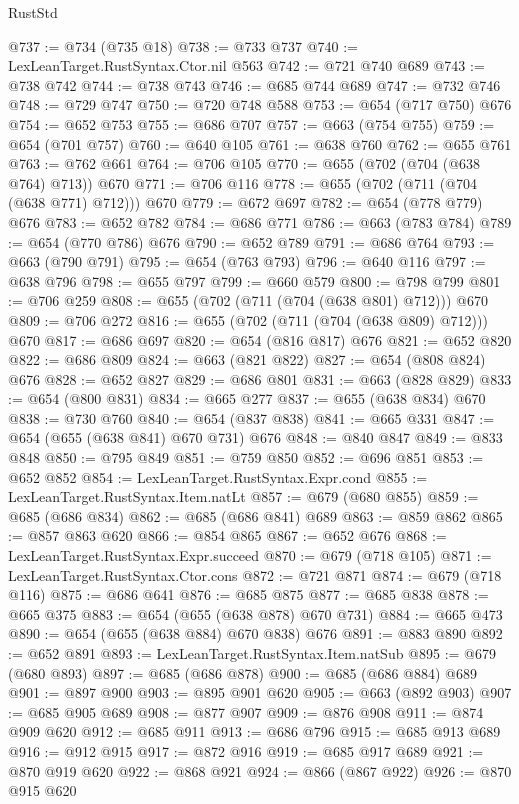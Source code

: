 \begin{lexlean}{RustStd}
\begin{coremodule}
@737 := @734 (@735 @18)
@738 := @733 @737
@740 := LexLeanTarget.RustSyntax.Ctor.nil @563
@742 := @721 @740 @689
@743 := @738 @742
@744 := @738 @743
@746 := @685 @744 @689
@747 := @732 @746
@748 := @729 @747
@750 := @720 @748 @588
@753 := @654 (@717 @750) @676
@754 := @652 @753
@755 := @686 @707
@757 := @663 (@754 @755)
@759 := @654 (@701 @757)
@760 := @640 @105
@761 := @638 @760
@762 := @655 @761
@763 := @762 @661
@764 := @706 @105
@770 := @655 (@702 (@704 (@638 @764) @713)) @670
@771 := @706 @116
@778 := @655 (@702 (@711 (@704 (@638 @771) @712))) @670
@779 := @672 @697
@782 := @654 (@778 @779) @676
@783 := @652 @782
@784 := @686 @771
@786 := @663 (@783 @784)
@789 := @654 (@770 @786) @676
@790 := @652 @789
@791 := @686 @764
@793 := @663 (@790 @791)
@795 := @654 (@763 @793)
@796 := @640 @116
@797 := @638 @796
@798 := @655 @797
@799 := @660 @579
@800 := @798 @799
@801 := @706 @259
@808 := @655 (@702 (@711 (@704 (@638 @801) @712))) @670
@809 := @706 @272
@816 := @655 (@702 (@711 (@704 (@638 @809) @712))) @670
@817 := @686 @697
@820 := @654 (@816 @817) @676
@821 := @652 @820
@822 := @686 @809
@824 := @663 (@821 @822)
@827 := @654 (@808 @824) @676
@828 := @652 @827
@829 := @686 @801
@831 := @663 (@828 @829)
@833 := @654 (@800 @831)
@834 := @665 @277
@837 := @655 (@638 @834) @670
@838 := @730 @760
@840 := @654 (@837 @838)
@841 := @665 @331
@847 := @654 (@655 (@638 @841) @670 @731) @676
@848 := @840 @847
@849 := @833 @848
@850 := @795 @849
@851 := @759 @850
@852 := @696 @851
@853 := @652 @852
@854 := LexLeanTarget.RustSyntax.Expr.cond
@855 := LexLeanTarget.RustSyntax.Item.natLt
@857 := @679 (@680 @855)
@859 := @685 (@686 @834)
@862 := @685 (@686 @841) @689
@863 := @859 @862
@865 := @857 @863 @620
@866 := @854 @865
@867 := @652 @676
@868 := LexLeanTarget.RustSyntax.Expr.succeed
@870 := @679 (@718 @105)
@871 := LexLeanTarget.RustSyntax.Ctor.cons
@872 := @721 @871
@874 := @679 (@718 @116)
@875 := @686 @641
@876 := @685 @875
@877 := @685 @838
@878 := @665 @375
@883 := @654 (@655 (@638 @878) @670 @731)
@884 := @665 @473
@890 := @654 (@655 (@638 @884) @670 @838) @676
@891 := @883 @890
@892 := @652 @891
@893 := LexLeanTarget.RustSyntax.Item.natSub
@895 := @679 (@680 @893)
@897 := @685 (@686 @878)
@900 := @685 (@686 @884) @689
@901 := @897 @900
@903 := @895 @901 @620
@905 := @663 (@892 @903)
@907 := @685 @905 @689
@908 := @877 @907
@909 := @876 @908
@911 := @874 @909 @620
@912 := @685 @911
@913 := @686 @796
@915 := @685 @913 @689
@916 := @912 @915
@917 := @872 @916
@919 := @685 @917 @689
@921 := @870 @919 @620
@922 := @868 @921
@924 := @866 (@867 @922)
@926 := @870 @915 @620

\end{coremodule}
\end{lexlean}
